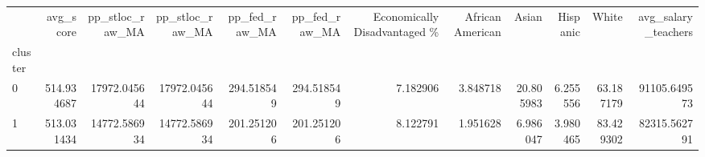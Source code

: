 \begin{tabular}{lrrrrrrrrrrr}
\toprule
{} &   avg\_score &  pp\_stloc\_raw\_MA &  pp\_stloc\_raw\_MA &  pp\_fed\_raw\_MA &  pp\_fed\_raw\_MA &  Economically Disadvantaged \% &  African American &      Asian &  Hispanic &      White &  avg\_salary\_teachers \\
cluster &             &                  &                  &                &                &                               &                   &            &           &            &                      \\
\midrule
0       &  514.934687 &     17972.045644 &     17972.045644 &     294.518549 &     294.518549 &                      7.182906 &          3.848718 &  20.805983 &  6.255556 &  63.187179 &         91105.649573 \\
1       &  513.031434 &     14772.586934 &     14772.586934 &     201.251206 &     201.251206 &                      8.122791 &          1.951628 &   6.986047 &  3.980465 &  83.429302 &         82315.562791 \\
\bottomrule
\end{tabular}
